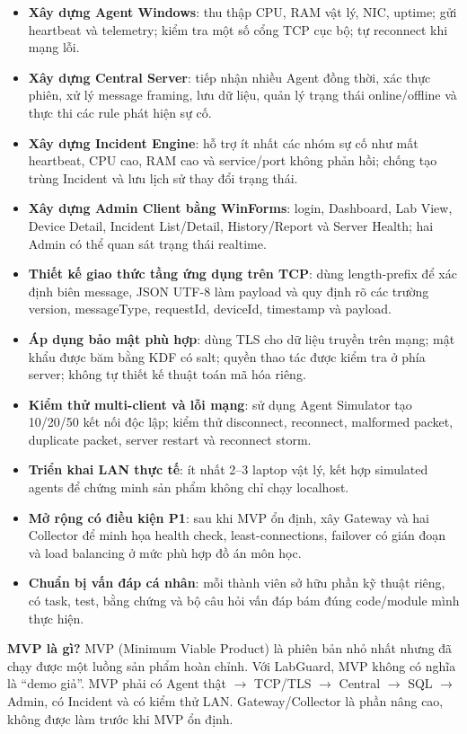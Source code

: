 \begin{itemize}
    \item \textbf{Xây dựng Agent Windows}: thu thập CPU, RAM vật lý, NIC, uptime; gửi heartbeat và telemetry; kiểm tra một số cổng TCP cục bộ; tự reconnect khi mạng lỗi.

    \item \textbf{Xây dựng Central Server}: tiếp nhận nhiều Agent đồng thời, xác thực phiên, xử lý message framing, lưu dữ liệu, quản lý trạng thái online/offline và thực thi các rule phát hiện sự cố.

    \item \textbf{Xây dựng Incident Engine}: hỗ trợ ít nhất các nhóm sự cố như mất heartbeat, CPU cao, RAM cao và service/port không phản hồi; chống tạo trùng Incident và lưu lịch sử thay đổi trạng thái.

    \item \textbf{Xây dựng Admin Client bằng WinForms}: login, Dashboard, Lab View, Device Detail, Incident List/Detail, History/Report và Server Health; hai Admin có thể quan sát trạng thái realtime.

    \item \textbf{Thiết kế giao thức tầng ứng dụng trên TCP}: dùng length-prefix để xác định biên message, JSON UTF-8 làm payload và quy định rõ các trường version, messageType, requestId, deviceId, timestamp và payload.

    \item \textbf{Áp dụng bảo mật phù hợp}: dùng TLS cho dữ liệu truyền trên mạng; mật khẩu được băm bằng KDF có salt; quyền thao tác được kiểm tra ở phía server; không tự thiết kế thuật toán mã hóa riêng.

    \item \textbf{Kiểm thử multi-client và lỗi mạng}: sử dụng Agent Simulator tạo 10/20/50 kết nối độc lập; kiểm thử disconnect, reconnect, malformed packet, duplicate packet, server restart và reconnect storm.

    \item \textbf{Triển khai LAN thực tế}: ít nhất 2--3 laptop vật lý, kết hợp simulated agents để chứng minh sản phẩm không chỉ chạy localhost.

    \item \textbf{Mở rộng có điều kiện P1}: sau khi MVP ổn định, xây Gateway và hai Collector để minh họa health check, least-connections, failover có gián đoạn và load balancing ở mức phù hợp đồ án môn học.

    \item \textbf{Chuẩn bị vấn đáp cá nhân}: mỗi thành viên sở hữu phần kỹ thuật riêng, có task, test, bằng chứng và bộ câu hỏi vấn đáp bám đúng code/module mình thực hiện.
\end{itemize}

\begin{beginnerbox}
\textbf{MVP là gì?} MVP (Minimum Viable Product) là phiên bản nhỏ nhất nhưng đã chạy được một luồng sản phẩm hoàn chỉnh. Với LabGuard, MVP không có nghĩa là ``demo giả''. MVP phải có Agent thật $\rightarrow$ TCP/TLS $\rightarrow$ Central $\rightarrow$ SQL $\rightarrow$ Admin, có Incident và có kiểm thử LAN. Gateway/Collector là phần nâng cao, không được làm trước khi MVP ổn định.
\end{beginnerbox}
